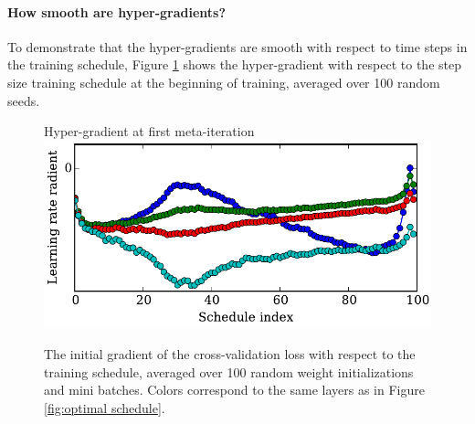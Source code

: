 \documentclass{article}
\begin{document}
\paragraph{How smooth are hyper-gradients?}
To demonstrate that the hyper-gradients are smooth with respect to time steps in the training schedule, Figure \ref{fig:smoothed gradient} shows the hyper-gradient with respect to the step size training schedule at the beginning of training, averaged over 100 random seeds.
%
\begin{figure}[h!]
\vskip 0.1in
\begin{center}
Hyper-gradient at first meta-iteration\\
\includegraphics[width=\columnwidth]{../experiments/Feb_3_training_schedules/5_initial_gradient/schedules_small.pdf}
\vskip -0.1in
\caption{The initial gradient of the cross-validation loss with respect to the training schedule, averaged over 100 random weight initializations and mini batches.
Colors correspond to the same layers as in Figure \ref{fig:optimal schedule}.}
\label{fig:smoothed gradient}
\end{center}
\vskip -0.2in
\end{figure} 
%
\end{document}
